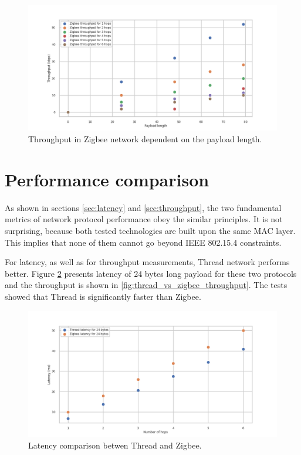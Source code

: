 \begin{figure}[H]
    \centering
    \includegraphics[scale=0.45]{images/Zigbee_Throughput_vs_length.png}
    \caption{Throughput in Zigbee network dependent on the payload length. }
    \label{fig:zigbee_throughput_length}
\end{figure}

\section{Performance comparison}
\label{sec:performance_comparison}

As shown in sections \ref{sec:latency} and \ref{sec:throughput}, the 
two fundamental metrics of network protocol performance obey the
similar principles. It is not surprising, because both tested 
technologies are built upon the same MAC layer. This implies that none
of them cannot go beyond IEEE 802.15.4 constraints.

For latency, as well as for throughput measurements, Thread network 
performs better. Figure \ref{fig:thread_vs_zigbee_latency} presents
latency of 24 bytes long payload for these two protocols and the 
throughput is shown in \ref{fig:thread_vs_zigbee_throughput}. The tests
showed that Thread is significantly faster than Zigbee.


\begin{figure}[H]
    \centering
    \includegraphics[scale=0.45]{images/Thread_vs_Zigbee_Latency.png}
    \caption{Latency comparison betwen Thread and Zigbee.}
    \label{fig:thread_vs_zigbee_latency}
\end{figure}

